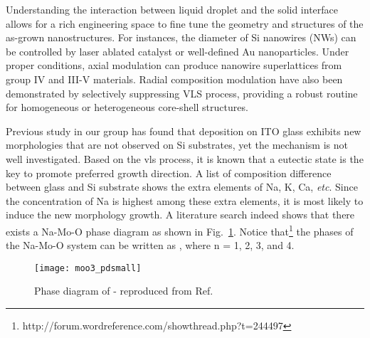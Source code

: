 Understanding the interaction between liquid droplet and the solid interface allows for a rich engineering space to fine tune the geometry and structures of the as-grown nanostructures. For instances, the diameter of Si nanowires (NWs) can be controlled by laser ablated catalyst\cite{Morales1998} or well-defined Au nanoparticles.\cite{Cui2001b} Under proper conditions, axial modulation can produce nanowire superlattices from group IV and III-V materials.\citep{Gudiksen2002,Bjork2002}  Radial composition modulation have also been demonstrated by selectively suppressing VLS process, providing a robust routine for homogeneous or heterogeneous core-shell structures.\cite{Lauhon2002a}  

Previous study in our group has found that  deposition on ITO glass exhibits new morphologies that are not observed on Si substrates, yet the mechanism is not well investigated.\cite{predeep2011} Based on the \gls{vls} process, it is known that a eutectic state is the key to promote preferred growth direction. A list of composition difference between glass and Si substrate shows the extra elements of Na, K, Ca, \emph{etc}. Since the concentration of Na is highest among these extra elements, it is most likely to induce the new morphology growth. A literature search indeed shows that there exists a Na-Mo-O phase diagram as shown in Fig.~\ref{fig:ch4pd}.\cite{Hoermann1929} Notice that\footnote{http://forum.wordreference.com/showthread.php?t=244497} the phases of the Na-Mo-O system can be written as , where n = 1, 2, 3, and 4. 

\begin{figure}[htb]
\centering
\texttt{[image: moo3\_pdsmall]}
\caption[Phase diagram of  and ]{Phase diagram of - reproduced from Ref.~\cite{Hoermann1929}}
\label{fig:ch4pd}
\end{figure}

